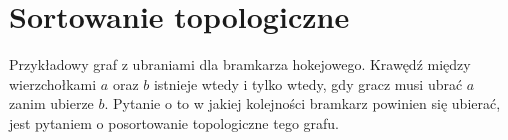 \section{Sortowanie topologiczne}

{
Przykładowy graf z ubraniami dla bramkarza hokejowego.
Krawędź między wierzchołkami $a$ oraz $b$ istnieje wtedy i tylko wtedy, gdy gracz musi ubrać $a$ zanim ubierze $b$.
Pytanie o to w jakiej kolejności bramkarz powinien się ubierać, jest pytaniem o posortowanie topologiczne tego grafu.
}
